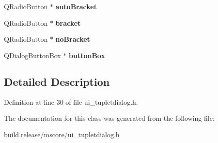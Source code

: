 \begin{DoxyCompactItemize}
Q\+Radio\+Button $\ast$ {\bfseries auto\+Bracket}
\item 
\mbox{\label{class_ui___tuplet_dialog_ad1e641c51ccd38b9e257de88838978c8}} 
Q\+Radio\+Button $\ast$ {\bfseries bracket}
\item 
\mbox{\label{class_ui___tuplet_dialog_a63163cb42f1230785691ba353a6c677f}} 
Q\+Radio\+Button $\ast$ {\bfseries no\+Bracket}
\item 
\mbox{\label{class_ui___tuplet_dialog_a73d0370cd8ba415362b31ff046f3c678}} 
Q\+Dialog\+Button\+Box $\ast$ {\bfseries button\+Box}
\end{DoxyCompactItemize}


\subsection{Detailed Description}


Definition at line 30 of file ui\+\_\+tupletdialog.\+h.



The documentation for this class was generated from the following file\+:\begin{DoxyCompactItemize}
\item 
build.\+release/mscore/ui\+\_\+tupletdialog.\+h\end{DoxyCompactItemize}

